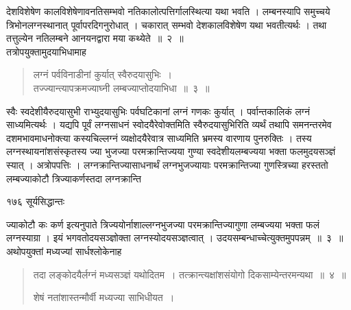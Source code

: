 \documentclass[11pt, openany]{book}
\begin{document}
\begin{sloppypar}
 देशविशेषेण कालविशेषेणावनतिसम्भवो नतिकालोत्पत्तिर्गालस्थित्या यथा भवति । लम्बनस्यापि समुच्चये त्रिभोनलग्नस्थानात् पूर्वापरदिगनुरोधात् । चकारात् सम्भवो देशकालविशेषेण यथा भवतीत्यर्थः । तथा तत्तुल्येन नतिलम्बने आनयनद्वारा मया कथ्येते~॥~२~॥\\
 \noindent तत्रोपयुक्तामुदयाभिधामाह\textendash
\end{sloppypar}


\begin{quote}
  {\ssi लग्नं पर्वविनाडीनां कुर्यात् स्वैरुदयासुभिः~।\\
तज्ज्यान्त्यापक्रमज्याघ्नी लम्बज्याप्तोदयाभिधा~॥~३~॥}
\end{quote}
\begin{sloppypar}
 स्वैः स्वदेशीयैरुदयासुभी राभ्युदयासुभिः पर्वघटिकानां लग्नं गणकः कुर्यात् । पर्वान्तकालिकं लग्नं साध्यमित्यर्थः । यद्यपि पूर्वं लग्नसाधनं स्वोदयैरेवोक्तमिति स्वैरुदयासुभिरिति व्यर्थं तथापि समनन्तरमेव दशमभावमाधनोक्त्या कस्यचिल्लग्नं व्यक्षोदयैरेवात्र साध्यमिति भ्रमस्य वारणाय पुनरुक्तिः । तस्य लग्नस्थायनांशसंस्कृतस्य ज्या भुजज्या परमक्रान्तिज्यया गुण्या स्वदेशीयलम्बज्यया भक्ता फलमुदयसञ्ज्ञं स्यात् । अत्रोपपत्तिः । लग्नक्रान्तिज्यासाधनार्थं लग्नभुजज्यायाः परमक्रान्तिज्या गुणस्त्रिच्या हरस्ततो लम्बज्याकोटौ त्रिज्याकर्णस्तदा लग्नक्रान्ति\textendash
\end{sloppypar}

\newpage



\noindent १७६ \hspace{4cm} सूर्यसिद्धान्तः 
\vspace{1cm}

\begin{sloppypar}
\noindent ज्याकोटौ कः कर्ण इत्यनुपाते त्रिज्ययोर्नाशाल्लग्नभुजज्या परमक्रान्तिज्यागुणा लम्बज्यया भक्ता फलं लग्नस्याग्रा । इयं भगवतोदयसञ्ज्ञोक्ता लग्नस्योदयसञ्ज्ञत्वात् । उदयसम्बन्धाच्चेत्युक्तमुपपन्नम्~॥~३~॥\\
\noindent अथोपयुक्तां मध्यज्यां सार्धश्लोकेनाह\textendash
\end{sloppypar}


\begin{quote}
  {\ssi तदा लङ्कोदयैर्लग्नं मध्यसञ्ज्ञं यथोदितम~।
तत्क्रान्त्यक्षांशसंयोगो दिकसाम्येन्तरमन्यथा~॥~४~॥

शेषं नतांशास्तन्मौर्वी मध्यज्या साभिधीयत~।}
\end{quote}
\end{document}
